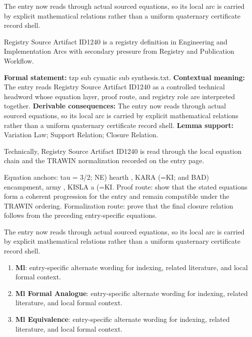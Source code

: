 The entry now reads through actual sourced equations, so its local arc is carried by explicit mathematical relations rather than a uniform quaternary certificate record shell.
\clearpage


\begingroup\small
{}
Registry Source Artifact ID1240 is a registry definition in Engineering and Implementation Arcs with secondary pressure from Registry and Publication Workflow.

\begingroup\footnotesize\setlength{\emergencystretch}{3em}\sloppy
\textbf{Formal statement:} tzp sub cymatic sub synthesis.txt. \textbf{Contextual meaning:} The entry reads Registry Source Artifact ID1240 as a controlled technical headword whose equation layer, proof route, and registry role are interpreted together. \textbf{Derivable consequences:} The entry now reads through actual sourced equations, so its local arc is carried by explicit mathematical relations rather than a uniform quaternary certificate record shell. \textbf{Lemma support:} Variation Law; Support Relation; Closure Relation.\par
\endgroup

Technically, Registry Source Artifact ID1240 is read through the local equation chain and the TRAWIN normalization recorded on the entry page.

Equation anchors: tau = 3/2; NE) hearth , KARA  (=KI; and BAD) encampment, army , KISLA   a (=KI. Proof route: show that the stated equations form a coherent progression for the entry and remain compatible under the TRAWIN ordering. Formalization route: prove that the final closure relation follows from the preceding entry-specific equations.

The entry now reads through actual sourced equations, so its local arc is carried by explicit mathematical relations rather than a uniform quaternary certificate record shell.
\endgroup

\begin{enumerate}[leftmargin=1.6em,itemsep=6pt,topsep=4pt]
\item \textbf{Ml}: entry-specific alternate wording for indexing, related literature, and local formal context.
\item \textbf{Ml Formal Analogue}: entry-specific alternate wording for indexing, related literature, and local formal context.
\item \textbf{Ml Equivalence}: entry-specific alternate wording for indexing, related literature, and local formal context.
\end{enumerate}

